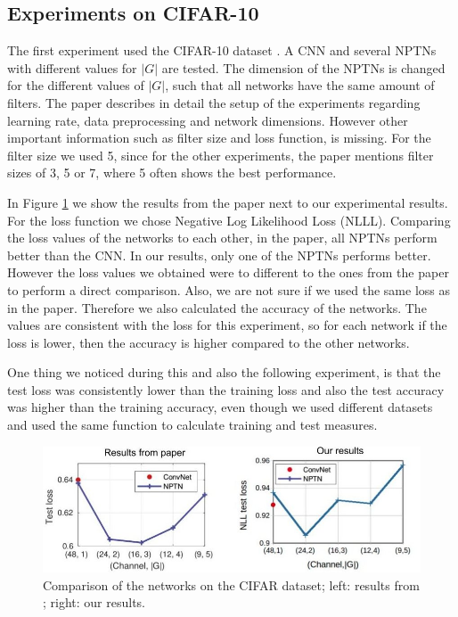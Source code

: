 \documentclass{llncs}
\begin{document}
\subsection{Experiments on CIFAR-10}
The first experiment used the CIFAR-10 dataset \cite{CIFAR}. A CNN and several NPTNs with different values for $|G|$ are tested. The dimension of the NPTNs is changed for the different values of $|G|$, such that all networks have the same amount of filters.
The paper describes in detail the setup of the experiments regarding learning rate, data preprocessing and network dimensions. However other important information such as filter size and loss function, is missing. 
For the filter size we used 5, since for the other experiments, the paper mentions  filter sizes of 3, 5 or 7, where 5 often shows the best performance.
 
In Figure \ref{pic:first_experiment} we show the results from the paper next to our experimental results. For the loss function we chose Negative Log Likelihood Loss (NLLL). 
Comparing the loss values of the networks to each other, in the paper, all NPTNs perform better than the CNN. In our results, only one of the NPTNs performs better.
However the loss values we obtained were to different to the ones from the paper to perform a direct comparison. 
Also, we are not sure if we used the same loss as in the paper.  Therefore we also calculated the accuracy of the networks. The values are consistent with the loss for this experiment, so for each network if the loss is lower, then the accuracy is higher compared to the other networks.

One thing we noticed during this and also the following experiment, is that the test loss was consistently lower than the training loss and also the test accuracy was higher than the training accuracy, even though we used different datasets and used the same function to calculate training and test measures.

\begin{figure}
	\begin{center}
	\includegraphics[scale=0.35]{result_images/experiment1.jpg}
	\caption{Comparison of the networks on the CIFAR dataset; left: results from \cite{NPTN18}; right: our results.}
	\label{pic:first_experiment}
	\end{center}
\end{figure}
\end{document}
